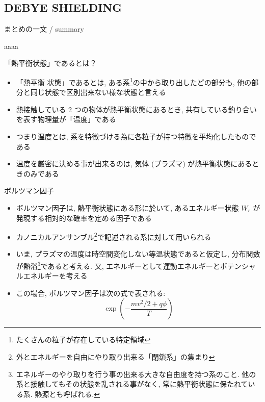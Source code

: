 \documentclass[10pt,dvipdfmx,landscape]{jsarticle}
\begin{document}
\subsection{DEBYE SHIELDING}
\begin{screen}
	まとめの一文 / summary
\end{screen}
%
aaaa  
\newpage
\begin{screen}
	「熱平衡状態」であるとは？
\end{screen}
%
\begin{itemize}
	\item 「熱平衡%
	状態」であるとは, ある系\footnote{たくさんの粒子が存在している特定領域}の中から取り出したどの部分も, 他の部分と同じ状態で区別出来ない様な状態と言える
	\item 熱接触している 2 つの物体が熱平衡状態にあるとき, 共有している釣り合いを表す物理量が「温度」である
	\item つまり温度とは, 系を特徴づける為に各粒子が持つ特徴を平均化したものである
	\item 温度を厳密に決める事が出来るのは, 気体 (プラズマ) が熱平衡状態にあるときのみである
\end{itemize}
\newpage
\begin{screen}
	ボルツマン因子
\end{screen}
%
\begin{itemize}
	\item ボルツマン因子は, 
熱平衡状態にある形に於いて, 
あるエネルギー状態 $W_r$ が発現する相対的な確率を定める因子である
	\item カノニカルアンサンブル\footnote{外とエネルギーを自由にやり取り出来る「閉鎖系」の集まり}で記述される系に対して用いられる
	\item いま, プラズマの温度は時空間変化しない等温状態であると仮定し, 分布関数が熱浴\footnote{エネルギーのやり取りを行う事の出来る大きな自由度を持つ系のこと. 他の系と接触してもその状態を乱される事がなく, 常に熱平衡状態に保たれている系. 熱源とも呼ばれる.}であると考える. 又, エネルギーとして運動エネルギーとポテンシャルエネルギーを考える
	\item この場合, ボルツマン因子は次の式で表される:
	\begin{equation}
		\exp \left( - \frac{m v^{2} / 2 + q \phi}{T} \right)
	\end{equation}
\end{itemize} 
\end{document}
